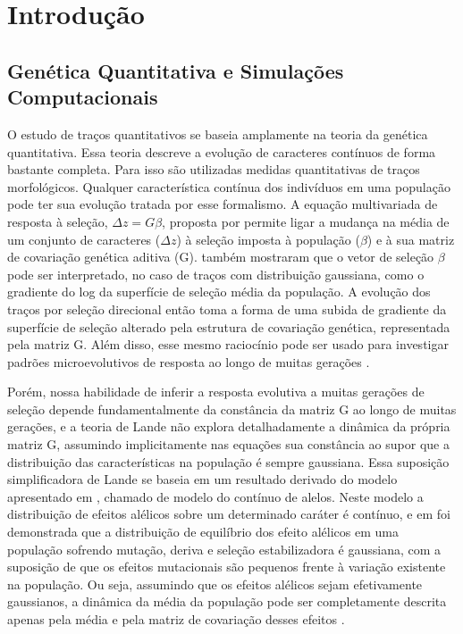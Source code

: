 \cleardoublepage
\pagestyle{fancy}

\chapter{Introdução}\label{intro}
\section{Genética Quantitativa e Simulações Computacionais}\label{intro:historico}

O estudo de traços quantitativos se baseia amplamente na teoria da
genética quantitativa. 
Essa teoria descreve a evolução de caracteres contínuos de forma
bastante completa. 
Para isso são utilizadas medidas quantitativas de traços
morfológicos. 
Qualquer característica contínua dos indivíduos em uma população pode
ter sua evolução tratada por esse formalismo. 
A equação multivariada de resposta à seleção, $\Delta z = G \beta$,
proposta por \cite{Lande1979} permite ligar a mudança na média de um
conjunto de caracteres ($\Delta z$) à seleção imposta à população
($\beta$) e à sua matriz de covariação genética aditiva (G). 
\cite{Lande1983} também mostraram que o vetor de seleção $\beta$
pode ser interpretado, no caso de traços com distribuição gaussiana,
como o gradiente do log da superfície de seleção média da população. 
A evolução dos traços por seleção direcional então toma a forma de uma
subida de gradiente da superfície de seleção alterado pela estrutura de
covariação genética, representada pela matriz G.
Além disso, esse mesmo raciocínio pode ser usado para investigar padrões
microevolutivos de resposta ao longo de muitas gerações
\citep{Lande1983, Marroig2004, Marroig2005}. 

Porém, nossa habilidade de inferir a resposta evolutiva a muitas
gerações de seleção depende fundamentalmente da constância da matriz G
ao longo de muitas gerações, e a teoria de Lande não explora
detalhadamente a dinâmica da própria matriz G, assumindo implicitamente
nas equações sua constância ao supor que a distribuição das
características na população é sempre gaussiana. 
Essa suposição simplificadora de Lande se baseia em um resultado
derivado do modelo apresentado em \cite{Crow1964}, chamado de modelo do
contínuo de alelos. 
Neste modelo a distribuição de efeitos alélicos sobre um determinado
caráter é contínuo, e em \cite{Kimura1965} foi demonstrada que a
distribuição de equilíbrio dos efeito alélicos em uma população sofrendo
mutação, deriva e seleção estabilizadora é gaussiana, com a suposição de
que os efeitos mutacionais são pequenos frente à variação existente na
população. 
Ou seja, assumindo que os efeitos alélicos sejam efetivamente
gaussianos, a dinâmica da média da população pode ser completamente
descrita apenas pela média e pela matriz de covariação desses efeitos
\citep{Barton1987}. 

